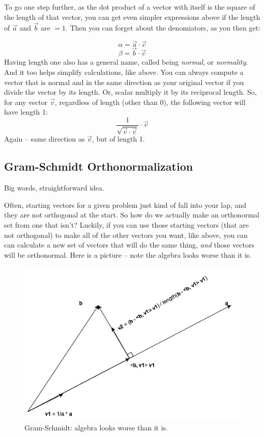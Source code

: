 \documentclass[
]{book}
\begin{document}
To go one step further, as the dot product of a vector with itself is the square of the length of that vector, you can get even simpler expressions above if the length of \(\vec{a}\) and \(\vec{b}\) are \(= 1\). Then you can forget about the denomiators, as you then get:

\[\alpha = \vec{a}\cdot\vec{c}\]
\[\beta = \vec{b}\cdot\vec{c}\]
Having length one also has a general name, called being \emph{normal}, or \emph{normality}. And it too helps simplify calculations, like above. You can always compute a vector that is normal and in the same direction as your original vector if you divide the vector by its length. Or, scalar multiply it by its reciprocal length. So, for any vector \(\vec{v}\), regardless of length (other than 0), the following vector will have length 1:
\[\frac{1}{\sqrt{\vec{v}\cdot\vec{v}}}\cdot\vec{v}\]
Again -- same direction as \(\vec{v}\), but of length 1.

\hypertarget{gram-schmidt-orthonormalization-1}{%
\subsection{Gram-Schmidt Orthonormalization}\label{gram-schmidt-orthonormalization-1}}

Big words, straightforward idea.

Often, starting vectors for a given problem just kind of fall into your lap, and they are not orthogonal at the start. So how do we actually make an orthonormal set from one that isn't? Luckily, if you can use those starting vectors (that are not orthogonal) to make all of the other vectors you want, like above, you can can calculate a new set of vectors that will do the same thing, \emph{and} those vectors will be orthonormal. Here is a picture -- note the algebra looks worse than it is.

\begin{figure}

{\centering \includegraphics[width=0.75\linewidth,height=0.75\textheight]{images/gram-schmidt} 

}

\caption{Gram-Schmidt: algebra looks worse than it is.}\label{fig:unnamed-chunk-10}
\end{figure}
\end{document}
